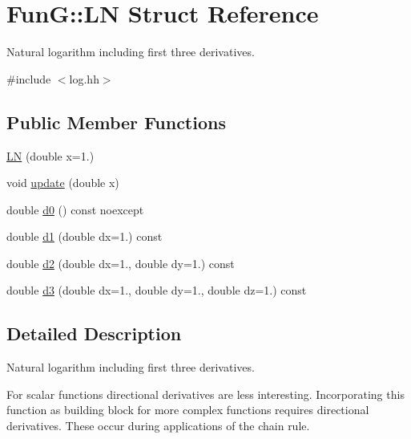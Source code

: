 \hypertarget{structFunG_1_1LN}{\section{\-Fun\-G\-:\-:\-L\-N \-Struct \-Reference}
\label{structFunG_1_1LN}
}


\-Natural logarithm including first three derivatives.  




{\ttfamily \#include $<$log.\-hh$>$}

\subsection*{\-Public \-Member \-Functions}
\begin{DoxyCompactItemize}
\item 
\hyperlink{structFunG_1_1LN_a4ce3d29669f550f6033da3e52fdac392}{\-L\-N} (double x=1.)
\item 
void \hyperlink{structFunG_1_1LN_aa0d58d6017b3c5bda5bef8f7936c6793}{update} (double x)
\item 
double \hyperlink{structFunG_1_1LN_ad3c5a2c592af1edaac73584e3f238485}{d0} () const noexcept
\item 
double \hyperlink{structFunG_1_1LN_a6ff08c85913403afee60ba58ea2acc92}{d1} (double dx=1.) const 
\item 
double \hyperlink{structFunG_1_1LN_a1b668f2fb3a0d290c2d16d7c3ef4e99f}{d2} (double dx=1., double dy=1.) const 
\item 
double \hyperlink{structFunG_1_1LN_ab1e18dcc7267e9ae5a47f91fe43d1f94}{d3} (double dx=1., double dy=1., double dz=1.) const 
\end{DoxyCompactItemize}


\subsection{\-Detailed \-Description}
\-Natural logarithm including first three derivatives. 

\-For scalar functions directional derivatives are less interesting. \-Incorporating this function as building block for more complex functions requires directional derivatives. \-These occur during applications of the chain rule. 

